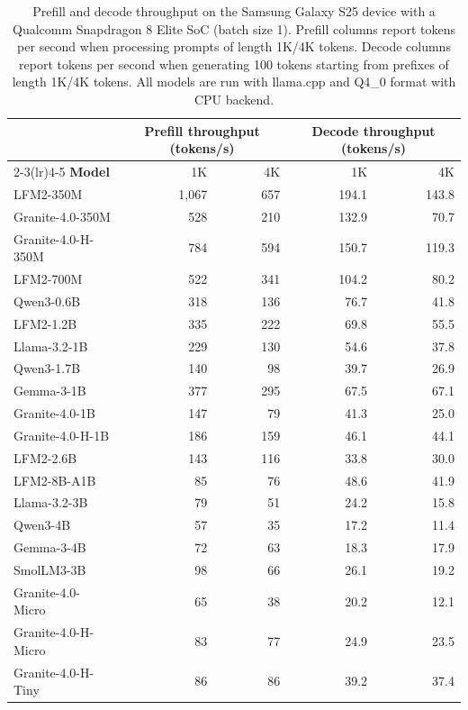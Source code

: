 \documentclass{article}
\begin{document}
\begin{table}[H]
\centering
\small
\begin{tabular}{lrrrr}
\toprule
& \multicolumn{2}{c}{\textbf{Prefill throughput (tokens/s)}} & \multicolumn{2}{c}{\textbf{Decode throughput (tokens/s)}}\\
\cmidrule(lr){2-3}\cmidrule(lr){4-5}
\textbf{Model} & 1K & 4K & 1K & 4K \\
\midrule
LFM2-350M & 1,067 & 657 & 194.1 & 143.8\\
Granite-4.0-350M & 528 & 210 & 132.9 & 70.7\\
Granite-4.0-H-350M & 784 & 594 & 150.7 & 119.3\\
\midrule
LFM2-700M & 522 & 341 & 104.2 & 80.2\\
Qwen3-0.6B & 318 & 136 & 76.7 & 41.8\\
\midrule
LFM2-1.2B & 335 & 222 & 69.8 & 55.5\\
Llama-3.2-1B  & 229 & 130 & 54.6 & 37.8\\
Qwen3-1.7B & 140 & 98 & 39.7 & 26.9\\
Gemma-3-1B  & 377 & 295 & 67.5 & 67.1\\
Granite-4.0-1B & 147 & 79 & 41.3 & 25.0\\
Granite-4.0-H-1B & 186 & 159 & 46.1 & 44.1\\
\midrule
LFM2-2.6B & 143 & 116 & 33.8 & 30.0\\
LFM2-8B-A1B & 85 & 76 & 48.6 & 41.9\\
Llama-3.2-3B  & 79 & 51 & 24.2 & 15.8\\
Qwen3-4B  & 57 & 35 & 17.2 & 11.4\\
Gemma-3-4B  & 72 & 63 & 18.3 & 17.9\\
SmolLM3-3B & 98 & 66 & 26.1 & 19.2\\
Granite-4.0-Micro & 65 & 38 & 20.2 & 12.1\\
Granite-4.0-H-Micro & 83 & 77 & 24.9 & 23.5\\
Granite-4.0-H-Tiny & 86 & 86 & 39.2 & 37.4\\
\bottomrule
\end{tabular}
\caption{Prefill and decode throughput on the Samsung Galaxy S25 device with a Qualcomm Snapdragon 8 Elite SoC (batch size 1). Prefill columns report tokens per second when processing prompts of length 1K/4K tokens. Decode columns report tokens per second when generating 100 tokens starting from prefixes of length 1K/4K tokens. All models are run with llama.cpp and Q4\_0 format with CPU backend.}
\label{tab:s25_inference}
\end{table}
\end{document}
